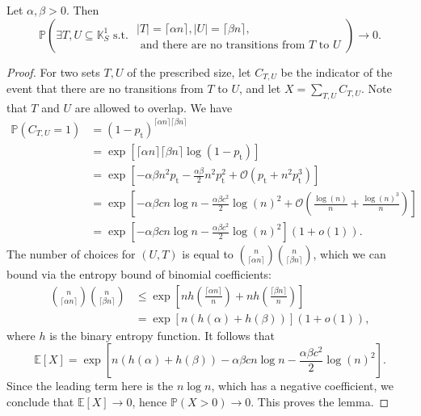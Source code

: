 \documentclass[10pt,a4paper]{amsart}
\newcommand\recht\operatorname
\begin{document}
\begin{lemma} \label{lem:noedges}
Let $\alpha,\beta > 0$. Then
\[
\mathbb{P}\left(\exists T,U \subseteq \mathbb{K}^1_S \textrm{ s.t. } \substack{ |T| = \lceil \alpha n\rceil, |U| = \lceil \beta n \rceil,\\\textrm{ and there are no transitions from $T$ to $U$}}\right) \rightarrow 0.
\]
\end{lemma}

\begin{proof}
For two sets $T,U$ of the prescribed size, let $C_{T,U}$ be the indicator of the event that there are no transitions from $T$ to $U$, and let $X = \sum_{T,U} C_{T,U}$. Note that $T$ and $U$ are allowed to overlap. We have 
\begin{align*}
\mathbb{P}(C_{T,U} = 1) &= (1-p_{\recht{t}})^{\lceil \alpha n\rceil\lceil \beta n\rceil}\\
&= \operatorname{exp}\left[ \lceil\alpha n \rceil \lceil \beta n \rceil\log(1-p_{\recht{t}})\right]\\
&= \operatorname{exp}\left[-\alpha\beta n^2p_{\recht{t}} - \tfrac{\alpha\beta}{2}n^2p_{\recht{t}}^2  + \mathcal{O}(p_{\recht{t}}+n^2p_{\recht{t}}^3) \right]\\
&= \operatorname{exp}\left[-\alpha\beta c n \log n - \frac{\alpha \beta c^2}{2}\log(n)^2 + \mathcal{O}\left(\tfrac{\log(n)}{n}+\tfrac{\log(n)^3}{n}\right) \right]\\
&= \operatorname{exp}\left[-\alpha\beta c n \log n - \frac{\alpha \beta c^2}{2}\log(n)^2\right](1+o(1)).
\end{align*}
The number of choices for $(U,T)$ is equal to $\binom{n}{\lceil \alpha n\rceil}\binom{n}{\lceil \beta n\rceil}$, which we can bound via the entropy bound of binomial coefficients:
\begin{align*}
\binom{n}{\lceil \alpha n\rceil}\binom{n}{\lceil \beta n\rceil} &\leq \operatorname{exp}\left[nh\left(\tfrac{\lceil \alpha n\rceil}{n}\right)+nh\left(\tfrac{\lceil \beta n\rceil}{n}\right)\right]\\
&= \operatorname{exp}\left[n(h(\alpha)+h(\beta))\right](1+o(1)),
\end{align*}
where $h$ is the binary entropy function. It follows that 
\[
\mathbb{E}[X] = \operatorname{exp}\left[n(h(\alpha)+h(\beta))-\alpha\beta c n \log n - \frac{\alpha \beta c^2}{2}\log(n)^2\right].
\]
Since the leading term here is the $n \log n$, which has a negative coefficient, we conclude that $\mathbb{E}[X] \rightarrow 0$, hence $\mathbb{P}(X > 0) \rightarrow 0$. This proves the lemma.
\end{proof}
\end{document}
